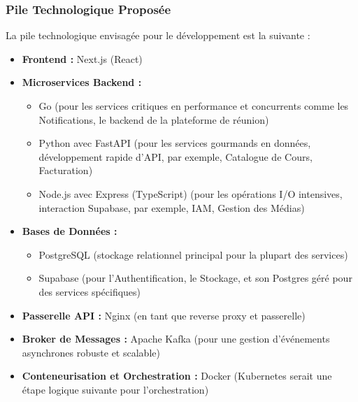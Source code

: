 \documentclass[12pt, a4paper]{article}
\begin{document}
\subsubsection{Pile Technologique Proposée}
La pile technologique envisagée pour le développement est la suivante :
\begin{itemize}
  \item \textbf{Frontend :} Next.js (React)
  \item \textbf{Microservices Backend :}
    \begin{itemize}
      \item Go (pour les services critiques en performance et concurrents comme les Notifications, le backend de la plateforme de réunion)
      \item Python avec FastAPI (pour les services gourmands en données, développement rapide d'API, par exemple, Catalogue de Cours, Facturation)
      \item Node.js avec Express (TypeScript) (pour les opérations I/O intensives, interaction Supabase, par exemple, IAM, Gestion des Médias)
    \end{itemize}
  \item \textbf{Bases de Données :}
    \begin{itemize}
      \item PostgreSQL (stockage relationnel principal pour la plupart des services)
      \item Supabase (pour l'Authentification, le Stockage, et son Postgres géré pour des services spécifiques)
    \end{itemize}
  \item \textbf{Passerelle API :} Nginx (en tant que reverse proxy et passerelle)
  \item \textbf{Broker de Messages :} Apache Kafka (pour une gestion d'événements asynchrones robuste et scalable)
  \item \textbf{Conteneurisation et Orchestration :} Docker (Kubernetes serait une étape logique suivante pour l'orchestration)
\end{itemize}
\end{document}
